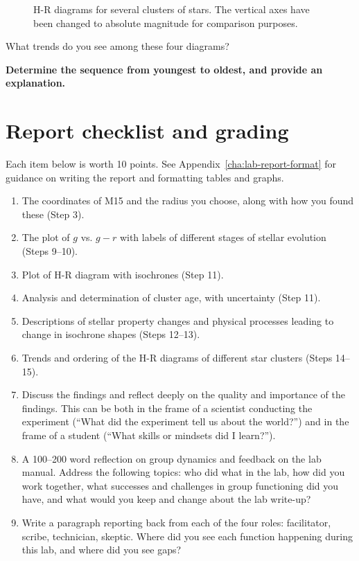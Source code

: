 \begin{figure}
	\caption{H-R diagrams for several clusters of stars. The vertical axes have been changed to absolute magnitude for comparison purposes.}\label{hr:fig:hrs}
\end{figure}

\begin{steps}

	\item What trends do you see among these four diagrams?
	
	\item \textbf{Determine the sequence from youngest to oldest, and provide an explanation.}
	
\end{steps}

\section{Report checklist and grading}

Each item below is worth 10 points. See Appendix\ \ref{cha:lab-report-format} for guidance on writing the report and formatting tables and graphs.

\begin{enumerate}
	
	\item The coordinates of M15 and the radius you choose, along with how you found these (Step 3).
	
	\item The plot of $g$ vs. $g-r$ with labels of different stages of stellar evolution (Steps 9--10).
	
	\item Plot of H-R diagram with isochrones (Step 11).
	
	\item Analysis and determination of cluster age, with uncertainty (Step 11).
	
	\item Descriptions of stellar property changes and physical processes leading to change in isochrone shapes (Steps 12--13).
	
	\item Trends and ordering of the H-R diagrams of different star clusters (Steps 14--15).
	
	\item Discuss the findings and reflect deeply on the quality and importance of the findings. This can
	be both in the frame of a scientist conducting the experiment (“What did the experiment tell us
	about the world?”) and in the frame of a student (“What skills or mindsets did I learn?”).
	
	\item A 100–200 word reflection on group dynamics and feedback on the lab manual. Address the
	following topics: who did what in the lab, how did you work together, what successes and
	challenges in group functioning did you have, and what would you keep and change about the
	lab write-up?
	
	\item Write a paragraph reporting back from each of the four roles: facilitator, scribe, technician,
	skeptic. Where did you see each function happening during this lab, and where did you see
	gaps?
\end{enumerate}